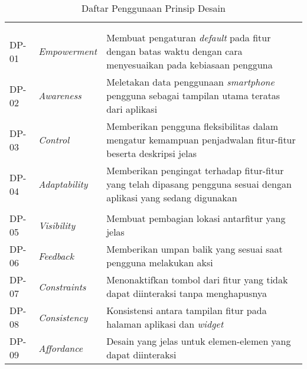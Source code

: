 \RaggedLeft
\begin{footnotesize}
\begin{longtable}[c]{|W{c}{0.07\textwidth}|>{\ccnormspacingcenter}m{0.18\textwidth}|>{\ccnormspacing}m{0.65\textwidth}|}
  \caption{Daftar Penggunaan Prinsip Desain}
  \label{tab:prinsip_desain} \\
  \hline {}
   &  &  \\ \hline \endfirsthead
  \hline {}
   &  &  \\ \hline \endhead

  \hline \endfoot
  
    \\ \hline
  DP-01 & \textit{Empowerment} & Membuat pengaturan \textit{default} pada fitur dengan batas waktu dengan cara menyesuaikan pada kebiasaan pengguna \\ \hline
  DP-02 & \textit{Awareness} & Meletakan data penggunaan \textit{smartphone} pengguna sebagai tampilan utama teratas dari aplikasi \\ \hline
  DP-03 & \textit{Control} & Memberikan pengguna fleksibilitas dalam mengatur kemampuan penjadwalan fitur-fitur beserta deskripsi jelas \\ \hline
  DP-04 & \textit{Adaptability} & Memberikan pengingat terhadap fitur-fitur yang telah dipasang pengguna sesuai dengan aplikasi yang sedang digunakan \\ \hline
    \\ \hline
  DP-05 & \textit{Visibility} & Membuat pembagian lokasi antarfitur yang jelas \\ \hline
  DP-06 & \textit{Feedback} & Memberikan umpan balik yang sesuai saat pengguna melakukan aksi \\ \hline
  DP-07 & \textit{Constraints} & Menonaktifkan tombol dari fitur yang tidak dapat diinteraksi tanpa menghapusnya \\ \hline
  DP-08 & \textit{Consistency} & Konsistensi antara tampilan fitur pada halaman aplikasi dan \textit{widget} \\ \hline
  DP-09 & \textit{Affordance} & Desain yang jelas untuk elemen-elemen yang dapat diinteraksi \\ \hline

\end{longtable}
\end{footnotesize}
\justifying


